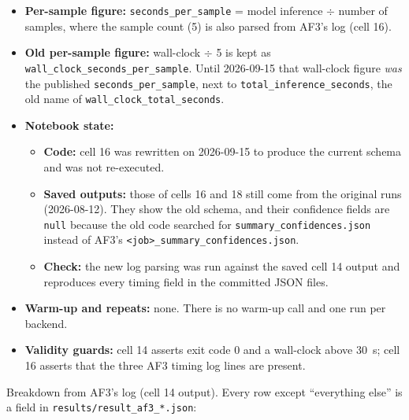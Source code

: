 \begin{itemize}
  \item \textbf{Per-sample figure:} \texttt{seconds\_per\_sample} = model inference $\div$ number of
    samples, where the sample count (5) is also parsed from AF3's log (cell 16).
  \item \textbf{Old per-sample figure:} wall-clock $\div$ 5 is kept as \texttt{wall\_\allowbreak{}clock\_\allowbreak{}seconds\_\allowbreak{}per\_\allowbreak{}sample}.
    Until 2026-09-15 that wall-clock figure \emph{was} the published \texttt{seconds\_per\_sample},
    next to \texttt{total\_\allowbreak{}inference\_\allowbreak{}seconds}, the old name of \texttt{wall\_\allowbreak{}clock\_\allowbreak{}total\_\allowbreak{}seconds}.
  \item \textbf{Notebook state:}
    \begin{itemize}
      \item \textbf{Code:} cell 16 was rewritten on 2026-09-15 to produce the current schema and
        was not re-executed.
      \item \textbf{Saved outputs:} those of cells 16 and 18 still come from the original runs
        (2026-08-12). They show the old schema, and their confidence fields are \texttt{null}
        because the old code searched for \texttt{summary\_\allowbreak{}confidences.json} instead of AF3's
        \texttt{\textless{}job\textgreater{}\_\allowbreak{}summary\_\allowbreak{}confidences.json}.
      \item \textbf{Check:} the new log parsing was run against the saved cell 14 output and
        reproduces every timing field in the committed JSON files.
    \end{itemize}
  \item \textbf{Warm-up and repeats:} none. There is no warm-up call and one run per backend.
  \item \textbf{Validity guards:} cell 14 asserts exit code 0 and a wall-clock above 30~s;
    cell 16 asserts that the three AF3 timing log lines are present.
\end{itemize}

Breakdown from AF3's log (cell 14 output). Every row except ``everything else'' is a
field in \texttt{results/\allowbreak{}result\_\allowbreak{}af3\_\allowbreak{}*.json}:

